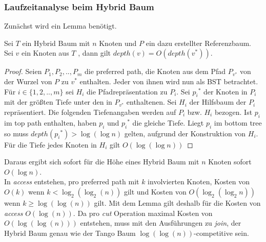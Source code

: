 \documentclass[a4paper,12pt]{article}
\begin{document}
\subsubsection{Laufzeitanalyse beim Hybrid Baum}
Zunächst wird ein Lemma benötigt.
\begin{Lemma} \label{hybridBalanced}
	Sei $T$ ein Hybrid Baum mit $n$ Knoten und $P$ ein dazu erstellter Referenzbaum. Sei $v$ ein Knoten aus $T$ , dann gilt $\mathit{depth}\left(v\right) = O\left(\mathit{depth\left(v^*\right)}\right)$.
\end{Lemma}
\begin{proof}
	Seien $P_1, P_2,.., P_m$ die preferred path, die Knoten aus dem Pfad $P_{v^*}$ von der Wurzel von $P$ zu $v^*$ enthalten. Jeder von ihnen wird nun als BST betrachtet. Für $i \in \{1, 2,..,m\}$ sei $H_i$ die Pfadrepräsentation zu $P_i$. Sei ${p_i}^*$ der Knoten in $P_i$ mit der größten Tiefe unter den in $P_{v^*}$  enthaltenen. Sei $H_i$ der Hilfsbaum der $P_i$ repräsentiert. Die folgenden Tiefenangaben werden auf $P_i$ bzw. $H_i$ bezogen. Ist $p_i$ im top path enthalten, haben $p_i$ und ${p_i}^*$ die gleiche Tiefe. Liegt $p_i$ im bottom tree so muss $\mathit{depth}\left({p_i}^*\right) > \log\left(\log n\right)$ gelten, aufgrund der Konstruktion von $H_i$. Für die Tiefe jedes Knoten in $H_i$ gilt $O\left(\log\left(\log n\right)\right)$    
	
\end{proof}
\noindent Daraus ergibt sich sofort für die Höhe eines Hybrid Baum mit $n$ Knoten sofort $O\left(\log n\right)$. \\
In \textit{access} entstehen, pro preferred path mit $k$ involvierten Knoten, Kosten von $O\left(k\right)$ wenn $k < \log_2\left(\log_2\left(n\right)\right)$ gilt und Kosten von $O\left(\log_2\left(\log_2 n\right)\right)$  wenn $k \geq \log\left(\log\left(n\right)\right)$ gilt. Mit dem Lemma gilt deshalb für die Kosten von \textit{access} $O\left(\log\left(n\right)\right)$. Da pro \textit{cut} Operation maximal Kosten von $O\left(\log\left(\log\left(n\right)\right)\right)$ entstehen, muss mit den Ausführungen zu \textit{join}, der Hybrid Baum genau wie der Tango Baum $\log \left(\log\left(n\right)\right)$-competitive sein.
\end{document}
